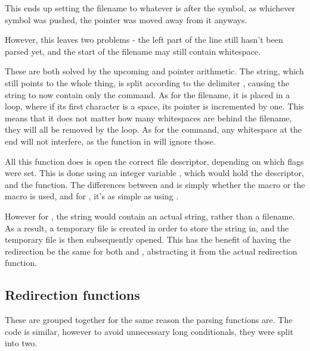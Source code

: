 \documentclass[12pt, a4paper]{report}
\begin{document}
                This ends up setting the filename to whatever is after the symbol, as
                whichever symbol was pushed, the pointer was moved away from it anyways.

                However, this leaves two problems - the left part of the line still
                hasn't been parsed yet, and the start of the filename may still
                contain whitespace.

                These are both solved by the upcoming  and pointer arithmetic.
                The  string, which still points to the whole thing, is split
                according to the \tx{<} delimiter , causing the
                 string to now contain only the command. As for the filename,
                it is placed in a loop, where if its first character is a space, its
                pointer is incremented by one. This means that it does not matter how
                many whitespaces are behind the filename, they will all be removed by the
                loop. As for the command, any whitespace at the end will not interfere,
                as the  function in  will ignore those.

                All this function does is open the correct file descriptor,
                depending on which flags were set. This is done using an
                integer variable , which would hold the descriptor,
                and the  function. The differences between \tx{>}
                and \tx{>>>} is simply whether the  macro or the 
                 macro is used, and for \tx{<}, it's as simple as
                using .

                However for \tx{<<<}, the  string would contain an 
                actual string, rather than a filename. As a result, a temporary
                file  is created in order to store the string in,
                and the temporary file is then subsequently opened. This has the
                benefit of having the redirection be the same for both \tx{<<<}
                and \tx{<}, abstracting it from the actual redirection function.
                \clearpage
            \subsection{Redirection functions}
                These are grouped together for the same reason the parsing
                functions are. The code is similar, however to avoid 
                unnecessary long conditionals, they were split into two.
\end{document}
